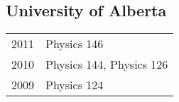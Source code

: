 \documentclass[letterpaper]{article}
\def\footerlink{}
\renewenvironment{itemize}{
  \begin{list}{}{
    \setlength{\leftmargin}{1.5em}
  }
}{
  \end{list}
}
\begin{document}
\subsection*{University of Alberta}
\begin{itemize}
\item \begin{tabular}{ll}
2011 & Physics 146 \\
2010 & Physics 144, Physics 126 \\
2009 & Physics 124 \\
\end{tabular}
\end{itemize}




\bigskip

\end{document}
